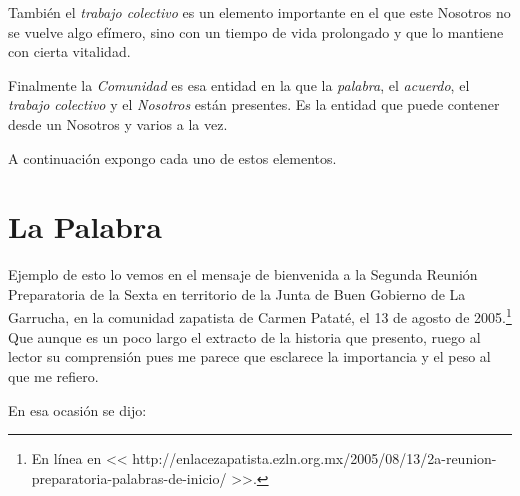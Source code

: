 \documentclass[oneside]{book}
\begin{document}
También el \textit{trabajo colectivo} es un elemento importante en el que este Nosotros no se vuelve algo efímero, sino con un tiempo de vida prolongado y que lo mantiene con cierta vitalidad.

Finalmente la \textit{Comunidad} es esa entidad en la que la \textit{palabra}, el \textit{acuerdo}, el \textit{trabajo colectivo} y el \textit{Nosotros} están presentes. Es la entidad que puede contener desde un Nosotros y varios a la vez.

A continuación expongo cada uno de estos elementos. 

\section{La Palabra}

Ejemplo de esto lo vemos en el mensaje de bienvenida a la Segunda Reunión Preparatoria de la Sexta en territorio de la Junta de Buen Gobierno de La Garrucha, en la comunidad zapatista de Carmen Pataté, el 13 de agosto de 2005.\footnote{En línea en << http://enlacezapatista.ezln.org.mx/2005/08/13/2a-reunion-preparatoria-palabras-de-inicio/ >>.} Que aunque es un poco largo el extracto de la historia que presento, ruego al lector su comprensión pues me parece que esclarece la importancia y el peso al que me refiero. 

En esa ocasión se dijo:
\end{document}
